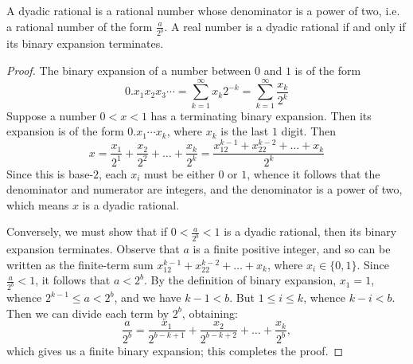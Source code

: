 \begin{lemma}
  A dyadic rational is a rational number whose denominator is a power of two, i.e. a rational number of the form $\frac{a}{2^b}$.
  A real number is a dyadic rational if and only if its binary expansion terminates.
\end{lemma}
\begin{proof}
  The binary expansion of a number between $0$ and $1$ is of the form
  \begin{equation*}
    0.x_1x_2x_3\cdots = \sum_{k=1}^{\infty}x_k2^{-k} = \sum_{k=1}^{\infty}\frac{x_k}{2^k}
  \end{equation*}
  Suppose a number $0 < x < 1$ has a terminating binary expansion.
  Then its expansion is of the form $0.x_1\cdots x_k$, where $x_k$ is the last $1$ digit.
  Then
  \begin{equation*}
    x = \frac{x_1}{2^1} + \frac{x_2}{2^2} + \ldots + \frac{x_k}{2^k} = \frac{x_12^{k-1} + x_22^{k-2} + \ldots + x_k}{2^k}
  \end{equation*}
  Since this is base-$2$, each $x_i$ must be either $0$ or $1$, whence it follows that the denominator and numerator are integers, and the denominator is a power of two, which means $x$ is a dyadic rational.

  Conversely, we must show that if $0 < \frac{a}{2^b} < 1$ is a dyadic rational, then its binary expansion terminates.
  Observe that $a$ is a finite positive integer, and so can be written as the finite-term sum $x_12^{k-1} + x_22^{k-2} + \ldots + x_k$, where $x_i \in \{0, 1\}$.
  Since $\frac{a}{2^b} < 1$, it follows that $a < 2^b$.
  By the definition of binary expansion, $x_1 = 1$, whence $2^{k-1} \le a < 2^b$, and we have $k-1<b$.
  But $1 \le i \le k$, whence $k-i<b$.
  Then we can divide each term by $2^b$, obtaining:
  \begin{equation*}
    \frac{a}{2^b} = \frac{x_1}{2^{b-k+1}} + \frac{x_2}{2^{b-k+2}} + \ldots + \frac{x_k}{2^b},
  \end{equation*}
  which gives us a finite binary expansion; this completes the proof.
\end{proof}

